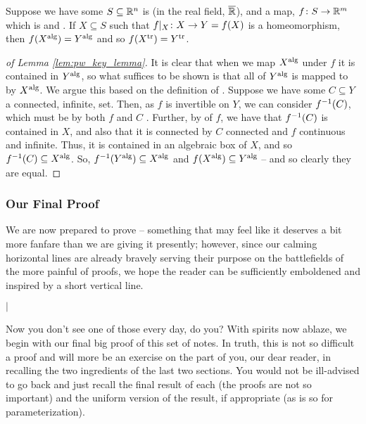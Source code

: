 \begin{lemma}
  Suppose we have some $S \subseteq \R^n$ is \sa ( in the real field, $\overline{\R}$), and a map, $\funcdom{f}{S}{\R^m}$ which is \sa and \inj. If $X \subseteq S$ such that $\funcrestr{f}{X} \colon X \to Y = f(X)$ is a homeomorphism, then $f(\Xalg[X]) = \Xalg[Y]$ and so $f(\Xtr[X]) = \Xtr[Y]$.
  \label{lem:pw_key_lemma}
\end{lemma}

\begin{proof}[of Lemma \ref{lem:pw_key_lemma}]
  It is clear that when we map $\Xalg[X]$ under $f$ it is contained in $\Xalg[Y]$, so what suffices to be shown is that all of $\Xalg[Y]$ is mapped to by $\Xalg[X]$. We argue this based on the definition of \saty. Suppose we have some $C \subseteq Y$ a connected, infinite, \sa set. Then, as $f$ is invertible on $Y$, we can consider $\inv{f}(C)$, which must be \sa by both $f$ and $C$ \sa. Further, by \injtvty of $f$, we have that $\inv{f}(C)$ is contained in $X$, and also that it is connected by $C$ connected and $f$ continuous and infinite. Thus, it is contained in an algebraic box of $X$, and so $\inv{f}(C) \subseteq \Xalg[X]$. So, $\inv{f}(\Xalg[Y]) \subseteq \Xalg[X]$ and $f(\Xalg[X]) \subseteq \Xalg[Y]$ -- and so clearly they are equal.
\end{proof}


\subsubsection{Our Final Proof}

We are now prepared to prove \pw -- something that may feel like it deserves a bit more fanfare than we are giving it presently; however, since our calming horizontal lines are already bravely serving their purpose on the battlefields of the more painful of proofs, we hope the reader can be sufficiently emboldened and inspired by a short vertical line.

\medskip
\centerline{$\mid$}
\medskip

Now you don't see one of those every day, do you? With spirits now ablaze, we begin with our final big proof of this set of notes. In truth, this is not so difficult a proof and will more be an exercise on the part of you, our dear reader, in recalling the two ingredients of the last two sections. You would not be ill-advised to go back and just recall the final result of each (the proofs are not so important) and the uniform version of the result, if appropriate (as is so for parameterization).

